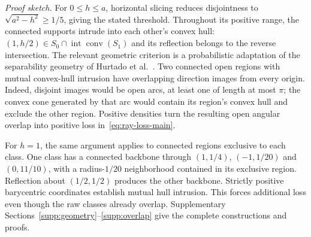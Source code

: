 \emph{Proof sketch.}
For $0\leq h\leq a$, horizontal slicing reduces disjointness to
$\sqrt{a^2-h^2}\geq1/5$, giving the stated threshold. Throughout its positive range, the connected supports intrude into each other's convex hull: $(1,h/2)\in S_0\cap\operatorname{int}\operatorname{conv}(S_1)$ and its reflection belongs to the reverse intersection. The relevant geometric criterion is a probabilistic adaptation of the separability geometry of Hurtado et al.\ \citep{Hurtado2001}. Two connected open regions with mutual convex-hull intrusion have overlapping direction images from every origin. Indeed, disjoint images would be open arcs, at least one of length at most $\pi$; the convex cone generated by that arc would contain its region's convex hull and exclude the other region. Positive densities turn the resulting open angular overlap into positive loss in~\eqref{eq:ray-loss-main}.

For $h=1$, the same argument applies to connected regions exclusive to each class. One class has a connected backbone through $(1,1/4)$, $(-1,1/20)$ and $(0,11/10)$, with a radius-$1/20$ neighborhood contained in its exclusive region. Reflection about $(1/2,1/2)$ produces the other backbone. Strictly positive barycentric coordinates establish mutual hull intrusion. This forces additional loss even though the raw classes already overlap. Supplementary Sections~\ref{supp:geometry}--\ref{supp:overlap} give the complete constructions and proofs.

